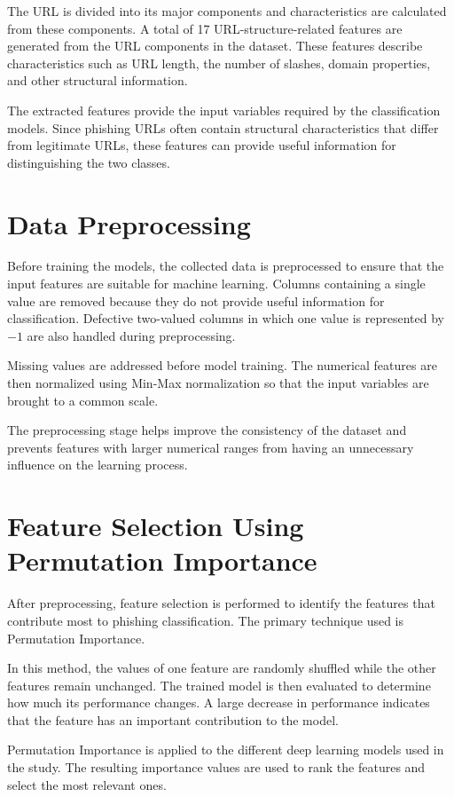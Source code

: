 \documentclass[12pt,a4paper]{report}
\begin{document}
The URL is divided into its major components and characteristics are calculated from these components. A total of 17 URL-structure-related features are generated from the URL components in the dataset. These features describe characteristics such as URL length, the number of slashes, domain properties, and other structural information.

The extracted features provide the input variables required by the classification models. Since phishing URLs often contain structural characteristics that differ from legitimate URLs, these features can provide useful information for distinguishing the two classes.

\section{Data Preprocessing}

Before training the models, the collected data is preprocessed to ensure that the input features are suitable for machine learning. Columns containing a single value are removed because they do not provide useful information for classification. Defective two-valued columns in which one value is represented by $-1$ are also handled during preprocessing.

Missing values are addressed before model training. The numerical features are then normalized using Min-Max normalization so that the input variables are brought to a common scale.

The preprocessing stage helps improve the consistency of the dataset and prevents features with larger numerical ranges from having an unnecessary influence on the learning process.

\section{Feature Selection Using Permutation Importance}

After preprocessing, feature selection is performed to identify the features that contribute most to phishing classification. The primary technique used is Permutation Importance.

In this method, the values of one feature are randomly shuffled while the other features remain unchanged. The trained model is then evaluated to determine how much its performance changes. A large decrease in performance indicates that the feature has an important contribution to the model.

Permutation Importance is applied to the different deep learning models used in the study. The resulting importance values are used to rank the features and select the most relevant ones.
\end{document}
